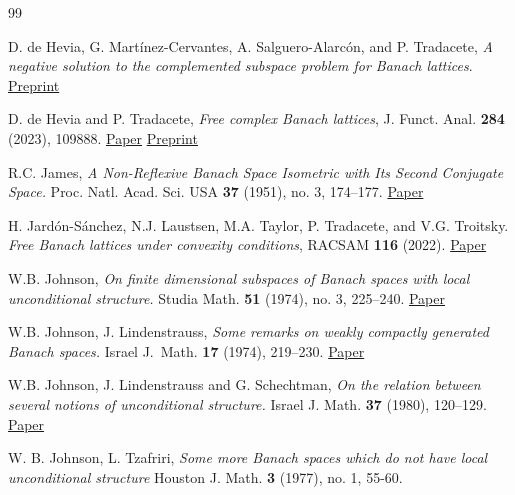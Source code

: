 \documentclass[11pt]{amsart}
\theoremstyle{definition}
\numberwithin{equation}{section}
\begin{document}
\begin{thebibliography}{99}




D. de Hevia, G. Martínez-Cervantes, A. Salguero-Alarcón, and P. Tradacete, \textit{A negative solution to the complemented subspace problem for Banach lattices}. \href{https://arxiv.org/abs/2310.02196}{Preprint}

D. de Hevia and P. Tradacete,
\textit{Free complex Banach lattices},
J. Funct. Anal. \textbf{284} (2023), 109888. \href{https://www.sciencedirect.com/science/article/pii/S0022123623000459}{Paper} \href{https://arxiv.org/abs/2207.08090}{Preprint}



R.C. James, \textit{A Non-Reflexive Banach Space Isometric with Its Second Conjugate Space.} Proc. Natl. Acad. Sci. USA \textbf{37} (1951), no. 3, 174--177. \href{https://www.jstor.org/stable/88062}{Paper}


H. Jardón-Sánchez, N.J. Laustsen, M.A. Taylor, P. Tradacete, and V.G. Troitsky. \emph{Free Banach lattices under convexity conditions}, RACSAM \textbf{116} (2022). \href{https://doi.org/10.1007/s13398-021-01155-8}{Paper}

W.B. Johnson, \textit{On finite dimensional subspaces of Banach spaces with local unconditional structure.} Studia Math. \textbf{51} (1974), no. 3, 225--240. \href{http://eudml.org/doc/217915}{Paper}


 W.B. Johnson, J. Lindenstrauss, \emph{Some remarks on weakly compactly generated Banach spaces.} Israel J.~Math. \textbf{17} (1974), 219--230. \href{https://doi.org/10.1007/BF02882239}{Paper}



W.B. Johnson, J. Lindenstrauss and G. Schechtman, \emph{On the relation between several notions of unconditional structure.} Israel J. Math. \textbf{37} (1980), 120–129. \href{https://doi.org/10.1007/BF02762873}{Paper}



W. B. Johnson, L. Tzafriri,
\textit{Some more Banach spaces which do not have local unconditional structure}
Houston J. Math. \textbf{3} (1977), no. 1, 55-60.


\end{thebibliography}
\end{document}
